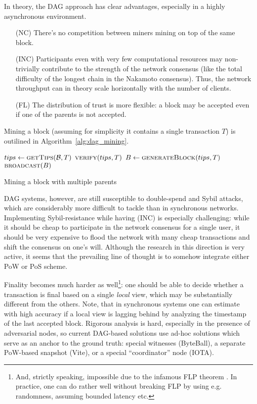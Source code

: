 \documentclass[a4paper]{article}
\begin{document}
In theory, the DAG approach has clear advantages, especially in a highly asynchronous environment.
\begin{enumerate}
   \item[(NC)] There's no competition between miners mining on top of the same block.
   
   \item[(INC)] Participants even with very few computational resources may non-trivially contribute to the strength of the network consensus (like the total difficulty of the longest chain in the Nakamoto consensus). Thus, the network throughput can in theory scale horizontally with the number of clients.
   
   \item[(FL)] The distribution of trust is more flexible: a block may be accepted even if one of the parents is not accepted.
\end{enumerate}

Mining a block (assuming for simplicity it contains a single transaction $T$) is outilined in  Algorithm~\ref{alg:dag_mining}.
\begin{algorithm}
\begin{algorithmic}[1] 
  \State $tips \gets \Call{getTips}{\mathcal{B}, T}$ 
  \State $\Call{verify}{tips, T}$
  \State $B \gets \Call{generateBlock}{tips, T}$ 
  \State $\Call{broadcast}{B}$
\EndProcedure

\end{algorithmic}
\caption{Mining a block with multiple parents}
\label{alg:dag_mining}
\end{algorithm}

DAG systems, however, are still susceptible to double-spend and Sybil attacks, which are considerably more difficult to tackle than in synchronous networks. Implementing Sybil-resistance while having (INC) is especially challenging: while it should be cheap to participate in the network consensus for a single user, it should be very expensive to flood the network with many cheap transactions and shift the consensus on one's will. Although the research in this direction is very active, it seems that the prevailing line of thought is to somehow integrate either PoW or PoS scheme.


Finality becomes much harder as well\footnote{And, strictly speaking, impossible due to the infamous FLP theorem \cite{FLP}. In practice, one can do rather well without breaking FLP by using e.g. randomness, assuming bounded latency etc.}: one should be able to decide whether a transaction is final based on a single \emph{local} view, which may be substantially different from the others. Note, that in synchronous systems one can estimate with high accuracy if a local view is lagging behind by analyzing the timestamp of the last accepted block. Rigorous analysis is hard, especially in the presence of adversarial nodes, so current DAG-based solutions use ad-hoc solutions which serve as an anchor to the ground truth: special witnesses (ByteBall)\cite{ByteBall}, a separate PoW-based snapshot (Vite)\cite{Vite}, or  a special ``coordinator'' node (IOTA)\cite{IOTAcoordinator}.
\end{document}
